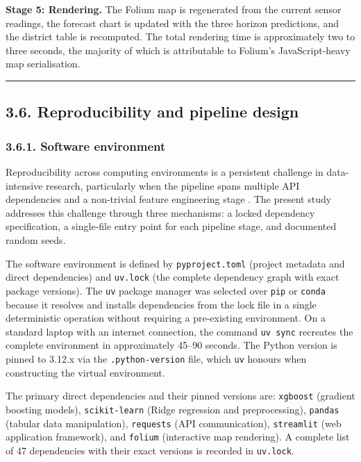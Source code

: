 \textbf{Stage 5: Rendering.} The Folium map is regenerated from the current sensor readings, the forecast chart is updated with the three horizon predictions, and the district table is recomputed. The total rendering time is approximately two to three seconds, the majority of which is attributable to Folium's JavaScript-heavy map serialisation.

\begin{center}\rule{0.5\linewidth}{0.5pt}\end{center}

\subsection{3.6. Reproducibility and pipeline design}\label{reproducibility-and-pipeline-design}

\subsubsection{3.6.1. Software environment}\label{software-environment}

Reproducibility across computing environments is a persistent challenge in data-intensive research, particularly when the pipeline spans multiple API dependencies and a non-trivial feature engineering stage \cite{pineau2021improving}. The present study addresses this challenge through three mechanisms: a locked dependency specification, a single-file entry point for each pipeline stage, and documented random seeds.

The software environment is defined by \texttt{pyproject.toml} (project metadata and direct dependencies) and \texttt{uv.lock} (the complete dependency graph with exact package versions). The \texttt{uv} package manager \cite{astral2024uv} was selected over \texttt{pip} or \texttt{conda} because it resolves and installs dependencies from the lock file in a single deterministic operation without requiring a pre-existing environment. On a standard laptop with an internet connection, the command \texttt{uv\ sync} recreates the complete environment in approximately 45--90 seconds. The Python version is pinned to 3.12.x via the \texttt{.python-version} file, which \texttt{uv} honours when constructing the virtual environment.

The primary direct dependencies and their pinned versions are: \texttt{xgboost} (gradient boosting models), \texttt{scikit-learn} (Ridge regression and preprocessing), \texttt{pandas} (tabular data manipulation), \texttt{requests} (API communication), \texttt{streamlit} (web application framework), and \texttt{folium} (interactive map rendering). A complete list of 47 dependencies with their exact versions is recorded in \texttt{uv.lock}.

